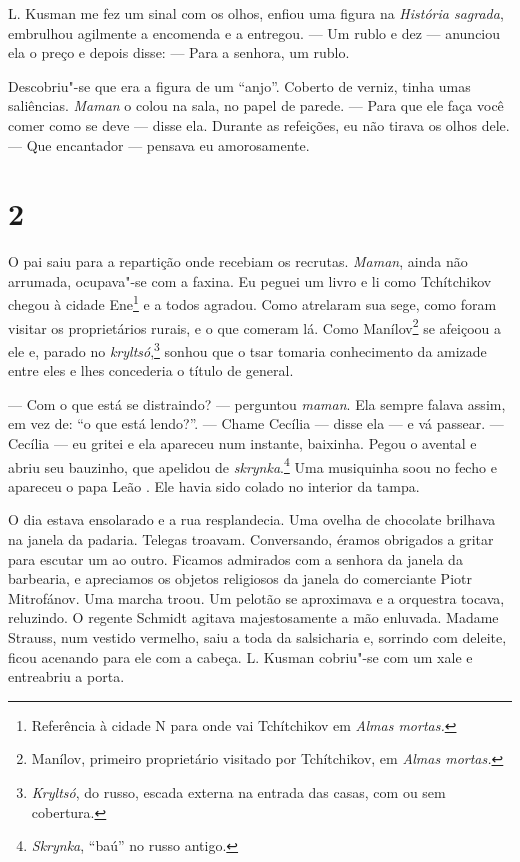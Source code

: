 L. Kusman me fez um sinal com os olhos, enfiou uma figura na
\emph{História sagrada}, embrulhou agilmente a encomenda e a entregou.
--- Um rublo e dez --- anunciou ela o preço e depois disse: --- Para a
senhora, um rublo.

Descobriu"-se que era a figura de um ``anjo''. Coberto de verniz, tinha
umas saliências. \emph{Maman} o colou na sala, no papel de parede. ---
Para que ele faça você comer como se deve --- disse ela. Durante as
refeições, eu não tirava os olhos dele. --- Que encantador --- pensava
eu amorosamente.

\section{2}

O pai saiu para a repartição onde recebiam os recrutas. \emph{Maman},
ainda não arrumada, ocupava"-se com a faxina. Eu peguei um livro e li
como Tchítchikov chegou à cidade Ene\footnote{Referência à cidade N para
  onde vai Tchítchikov em \emph{Almas mortas.}} e a todos agradou.
Como atrelaram sua sege, como foram visitar os proprietários rurais, e o
que comeram lá. Como Manílov\footnote{Manílov, primeiro proprietário
  visitado por Tchítchikov, em \emph{Almas mortas. }} se afeiçoou a ele
e, parado no \emph{kryltsó},\footnote{\emph{Kryltsó}, do russo, escada
  externa na entrada das casas, com ou sem cobertura.} sonhou que o tsar
tomaria conhecimento da amizade entre eles e lhes concederia o título de
general.

--- Com o que está se distraindo? --- perguntou \emph{maman}. Ela sempre
falava assim, em vez de: ``o que está lendo?''. --- Chame Cecília ---
disse ela --- e vá passear. --- Cecília --- eu gritei e ela apareceu num
instante, baixinha. Pegou o avental e abriu seu bauzinho, que apelidou
de \emph{skrynka}.\footnote{\emph{Skrynka}, ``baú'' no russo antigo.}
Uma musiquinha soou no fecho e apareceu o papa Leão \scalebox{.8}{XIII}. Ele havia sido
colado no interior da tampa.

O dia estava ensolarado e a rua resplandecia. Uma ovelha de chocolate
brilhava na janela da padaria. Telegas troavam. Conversando, éramos
obrigados a gritar para escutar um ao outro. Ficamos admirados com a
senhora da janela da barbearia, e apreciamos os objetos religiosos da
janela do comerciante Piotr Mitrofánov. Uma marcha troou. Um pelotão se
aproximava e a orquestra tocava, reluzindo. O regente Schmidt agitava
majestosamente a mão enluvada. Madame Strauss, num vestido vermelho,
saiu a toda da salsicharia e, sorrindo com deleite, ficou acenando para
ele com a cabeça. L. Kusman cobriu"-se com um xale e entreabriu a porta.

